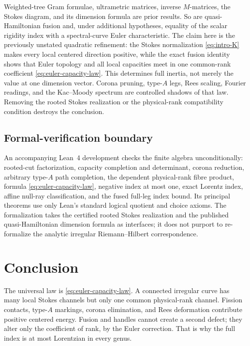 \documentclass[11pt,a4paper]{amsart}
\theoremstyle{plain}
\theoremstyle{definition}
\begin{document}
Weighted-tree Gram formulae, ultrametric matrices, inverse $M$-matrices, the Stokes diagram, and its
dimension formula are prior results.  So are quasi-Hamiltonian fusion and, under additional
hypotheses, equality of the scalar rigidity index with a spectral-curve Euler characteristic.
The claim here is the previously unstated quadratic refinement: the Stokes normalization
\eqref{eq:intro-K} makes every local centered direction positive, while the exact fusion identity
shows that Euler topology and all local capacities meet in one common-rank coefficient
\eqref{eq:euler-capacity-law}.  This determines full inertia, not merely the value at one dimension
vector.  Corona pruning, type-$A$ legs, Rees scaling, Fourier readings, and the Kac--Moody spectrum
are controlled shadows of that law.  Removing the rooted Stokes realization or the physical-rank
compatibility condition destroys the conclusion.

\subsection{Formal-verification boundary}

An accompanying Lean~4 development checks the finite algebra unconditionally: rooted-cut
factorization, capacity completion and determinant, corona reduction, arbitrary type-$A$ path
completion, the dependent physical-rank fibre product, formula \eqref{eq:euler-capacity-law},
negative index at most one, exact Lorentz index, affine null-ray classification, and the fused
full-leg index bound.  Its principal theorems use only Lean's standard logical quotient and choice
axioms.  The formalization takes the certified rooted Stokes realization and the published
quasi-Hamiltonian dimension formula as interfaces; it does not purport to re-formalize the analytic
irregular Riemann--Hilbert correspondence.

\section{Conclusion}

The universal law is \eqref{eq:euler-capacity-law}.  A connected irregular curve has many local
Stokes channels but only one common physical-rank channel.  Fission contacts, type-$A$ markings,
corona elimination, and Rees deformation contribute positive centered energy.  Fusion and handles
cannot create a second defect; they alter only the coefficient of rank, by the Euler correction.
That is why the full index is at most Lorentzian in every genus.
\end{document}
